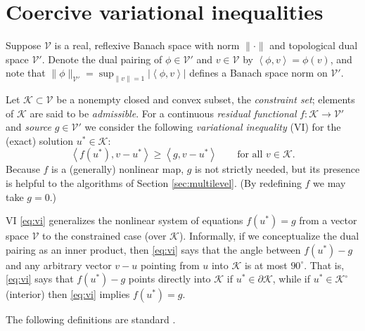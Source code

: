 \documentclass[letterpaper,final,12pt,reqno]{amsart}
\theoremstyle{cstyle}
\theoremstyle{dstyle}
\numberwithin{equation}{section}
\numberwithin{figure}{section}
\numberwithin{table}{section}
\numberwithin{theorem}{section}
\newcommand{\cK}{\mathcal{K}}
\newcommand{\cV}{\mathcal{V}}
\newcommand{\ip}[2]{\left<#1,#2\right>}
\begin{document}


\section{Coercive variational inequalities} \label{sec:vi}

Suppose $\cV$ is a real, reflexive Banach space with norm $\|\cdot\|$ and topological dual space $\cV'$.  Denote the dual pairing of $\phi \in \cV'$ and $v\in\cV$ by $\ip{\phi}{v} = \phi(v)$, and note that $\|\phi\|_{\cV'} = \sup_{\|v\|=1} |\ip{\phi}{v}|$ defines a Banach space norm on $\cV'$.

Let $\cK \subset \cV$ be a nonempty closed and convex subset, the \emph{constraint set}; elements of $\cK$ are said to be \emph{admissible}.  For a continuous \emph{residual functional} $f:\cK \to \cV'$ and \emph{source} $g\in \cV'$ we consider the following \emph{variational inequality} (VI) for the (exact) solution $u^*\in \cK$:
\begin{equation}
\ip{f(u^*)}{v-u^*} \ge \ip{g}{v-u^*} \qquad \text{for all } v\in \cK. \label{eq:vi}
\end{equation}
Because $f$ is a (generally) nonlinear map, $g$ is not strictly needed, but its presence is helpful to the algorithms of Section \ref{sec:multilevel}.  (By redefining $f$ we may take $g=0$.)

VI \eqref{eq:vi} generalizes the nonlinear system of equations $f(u^*)=g$ from a vector space $\cV$ to the constrained case (over $\cK$).  Informally, if we conceptualize the dual pairing as an inner product, then \eqref{eq:vi} says that the angle between $f(u^*)-g$ and any arbitrary vector $v-u$ pointing from $u$ into $\cK$ is at most $90^\circ$.  That is, \eqref{eq:vi} says that $f(u^*)-g$ points directly into $\cK$ if $u^* \in\partial\cK$, while if $u^* \in \cK^\circ$ (interior) then \eqref{eq:vi} implies $f(u^*)=g$.

The following definitions are standard \cite{KinderlehrerStampacchia1980}.
\end{document}
